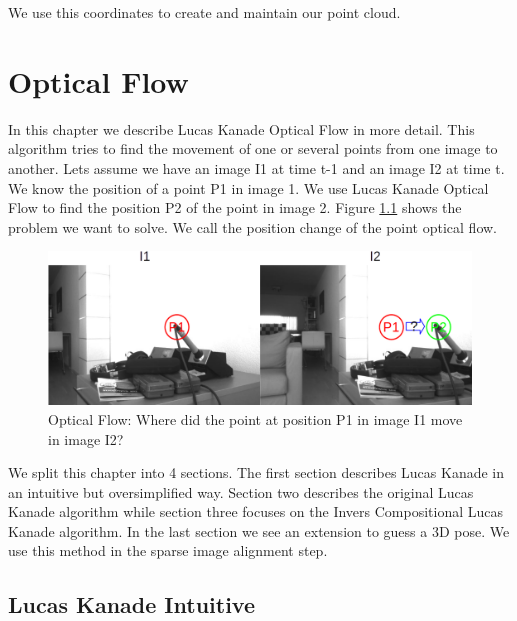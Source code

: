 \documentclass[11pt,a4paper,titlepage,oneside]{report}
\begin{document}
We use this coordinates to create and maintain our point cloud.

\chapter{Optical Flow}\label{ch:opt_flow}

In this chapter we describe Lucas Kanade Optical Flow in more detail. This algorithm tries to find the movement of one or several points from one image to another. Lets assume we have an image I1 at time t-1 and an image I2 at time t. We know the position of a point P1 in image 1. We use Lucas Kanade Optical Flow to find the position P2 of the point in image 2. Figure \ref{fig:optical_flow} shows the problem we want to solve. We call the position change of the point optical flow.

\begin{figure}[H]
	\includegraphics[width=1.0\textwidth]{img/optical_flow.png}
	\caption{Optical Flow: Where did the point at position P1 in image I1 move in image I2?}\label{fig:optical_flow}
\end{figure}

We split this chapter into 4 sections. The first section describes Lucas Kanade in an intuitive but oversimplified way. Section two describes the original Lucas Kanade algorithm while section three focuses on the Invers Compositional Lucas Kanade algorithm. In the last section we see an extension to guess a 3D pose. We use this method in the sparse image alignment step.

\section{Lucas Kanade Intuitive}
\end{document}
